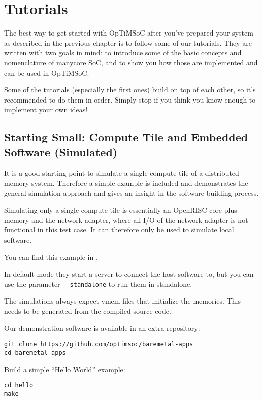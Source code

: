\chapter{Tutorials}
\label{chap:tutorials}

The best way to get started with OpTiMSoC after you've prepared your
system as described in the previous chapter is to follow some of our
tutorials. They are written with two goals in mind: to introduce some
of the basic concepts and nomenclature of manycore SoC, and to show
you how those are implemented and can be used in OpTiMSoC.

Some of the tutorials (especially the first ones) build on top of each
other, so it's recommended to do them in order. Simply stop if you
think you know enough to implement your own ideas!

\section{Starting Small: Compute Tile and Embedded Software (Simulated)}

It is a good starting point to simulate a single compute tile of a
distributed memory system. Therefore a simple example is included and
demonstrates the general simulation approach and gives an insight in
the software building process.

Simulating only a single compute tile is essentially an OpenRISC core
plus memory and the network adapter, where all I/O of the network
adapter is not functional in this test case. It can therefore only be
used to simulate local software.

You can find this example in
.

In default mode they start a server to connect the host software to,
but you can use the parameter \verb|--standalone| to run them in
standalone.

The simulations always expect vmem files that initialize the memories.
This needs to be generated from the compiled source code.

Our demonstration software is available in an extra repository:

\begin{lstlisting}
git clone https://github.com/optimsoc/baremetal-apps
cd baremetal-apps
\end{lstlisting}

Build a simple ``Hello World'' example:

\begin{lstlisting}
cd hello
make
\end{lstlisting}

